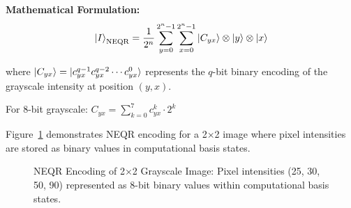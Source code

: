 \documentclass[11pt,a4paper]{article}
\begin{document}
\textbf{Mathematical Formulation:}
\begin{equation}
\ket{I}_{\text{NEQR}} = \frac{1}{2^n} \sum_{y=0}^{2^n-1} \sum_{x=0}^{2^n-1} \ket{C_{yx}} \otimes \ket{y} \otimes \ket{x}
\label{eq:neqr_state}
\end{equation}

where $\ket{C_{yx}} = \ket{c_{yx}^{q-1} c_{yx}^{q-2} \cdots c_{yx}^0}$ represents the $q$-bit binary encoding of the grayscale intensity at position $(y, x)$.

For 8-bit grayscale: $C_{yx} = \sum_{k=0}^{7} c_{yx}^k \cdot 2^k$

Figure~\ref{fig:neqr_example} demonstrates NEQR encoding for a 2×2 image where pixel intensities are stored as binary values in computational basis states.

\begin{figure}[H]
\centering
{}
\caption{NEQR Encoding of 2×2 Grayscale Image: Pixel intensities (25, 30, 50, 90) represented as 8-bit binary values within computational basis states.}
\label{fig:neqr_example}
\end{figure}
\end{document}
